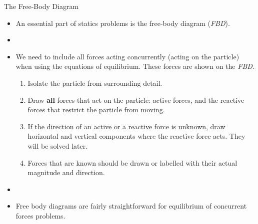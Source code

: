 \documentclass[9pt, xcolor={svgnames, x11names},professionalfonts]{beamer}
\begin{document}
\begin{frame}{The Free-Body Diagram}
	\begin{itemize}
		\item An essential part of statics problems is the free-body diagram (\textit{FBD}).
		\item[]\item We need to include all forces acting concurrently (acting on the particle) when using the equations of equilibrium. These forces are shown on the \textit{ FBD}.
		      \parm
		      \begin{enumerate}
		      	\item Isolate the particle from surrounding detail.\parm
		      	\item Draw {\bfseries all} forces that act on the particle: active forces, and the reactive forces that restrict the particle from moving. \parm
		      	\item If the direction of an active or a reactive force is unknown, draw horizontal and vertical components where the reactive force acts. They will be solved later. \parm
		      	\item Forces that are known should be drawn or labelled with their actual magnitude and direction.
		      \end{enumerate}
		\item[]\item Free body diagrams are fairly straightforward for equilibrium of concurrent forces problems.
	\end{itemize}
\end{frame}



\end{document}

